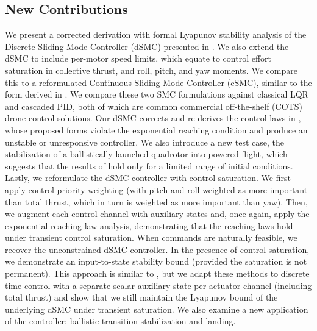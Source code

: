 \documentclass[conf]{new-aiaa}
\begin{document}
\subsection{New Contributions}
We present a corrected derivation with formal Lyapunov stability analysis of the Discrete Sliding Mode Controller (dSMC) presented in \cite{refs:Xiong2016}. We also extend the dSMC to include per-motor speed limits, which equate to control effort saturation in collective thrust, and roll, pitch, and yaw moments. We compare this to a reformulated Continuous Sliding Mode Controller (cSMC), similar to the form derived in \cite{refs:Tahir2020}. We compare these two SMC formulations against classical LQR and cascaded PID, both of which are common commercial off-the-shelf (COTS) drone control solutions. Our dSMC corrects and re-derives the control laws in \cite{refs:Xiong2016}, whose proposed forms violate the exponential reaching condition and produce an unstable or unresponsive controller. We also introduce a new test case, the stabilization of a ballistically launched quadrotor into powered flight, which suggests that the results of \cite{refs:Tahir2020} hold only for a limited range of initial conditions. Lastly, we reformulate the dSMC controller with control saturation. We first apply control-priority weighting (with pitch and roll weighted as more important than total thrust, which in turn is weighted as more important than yaw). Then, we augment each control channel with auxiliary states and, once again, apply the exponential reaching law analysis, demonstrating that the reaching laws hold under transient control saturation. When commands are naturally feasible, we recover the unconstrained dSMC controller. In the presence of control saturation, we demonstrate an input-to-state stability bound (provided the saturation is not permanent). This approach is similar to \cite{refs:Wang2005, refs:JiangWang2001}, but we adapt these methods to discrete time control with a separate scalar auxiliary state per actuator channel (including total thrust) and show that we still maintain the Lyapunov bound of the underlying dSMC under transient saturation. We also examine a new application of the controller; ballistic transition stabilization and landing.
\end{document}
